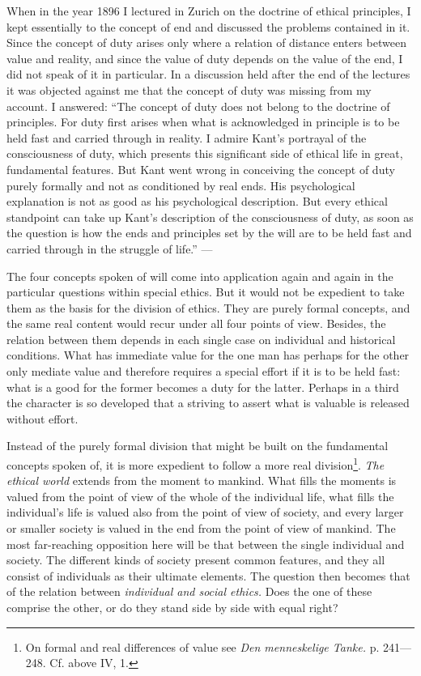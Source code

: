 \documentclass[12pt,a4paper,openany]{book}
\newcommand{\opage}[1]{\marginnote{\footnotesize\textit{[#1]}}}
\begin{document}
When in the year 1896 I lectured in Zurich on the doctrine of ethical principles, I kept essentially to the
concept of end and discussed the problems contained in it. Since the concept of duty arises only where a
relation of distance enters between value and reality, and since the value of duty depends on the value of
the end, I did not speak of it in particular. In a discussion held after the end of the lectures it was
objected against me that the concept of duty was missing from my account. I answered: ``The concept of duty
does not belong to the doctrine of principles. For duty first arises when what is acknowledged in principle
is to be held fast and carried through in reality. I admire Kant's portrayal of the consciousness of duty,
which presents this significant side of ethical life in great, fundamental features. But Kant went wrong in
conceiving the concept of duty purely formally and not as conditioned by real ends. His psychological
explanation is not as good as his psychological description. But every ethical standpoint can take up Kant's
description of the consciousness
\opage{160}of duty, as soon as the question is how the ends and principles set by the will are to be held fast and
carried through in the struggle of life.'' ---

The four concepts spoken of will come into application again and again in the particular questions within
special ethics. But it would not be expedient to take them as the basis for the division of ethics. They are
purely formal concepts, and the same real content would recur under all four points of view. Besides, the
relation between them depends in each single case on individual and historical conditions. What has
immediate value for the one man has perhaps for the other only mediate value and therefore requires a special
effort if it is to be held fast: what is a good for the former becomes a duty for the latter. Perhaps in a
third the character is so developed that a striving to assert what is valuable is released without effort.

Instead of the purely formal division that might be built on the fundamental concepts spoken of, it is more
expedient to follow a more real division\footnote[1]{On formal and real differences of value see \textit{Den
menneskelige Tanke.} p. 241---248. Cf. above IV, 1.}. \textit{The ethical world} extends from the
moment to mankind. What fills the moments is valued from the point of view of the whole of the individual
life, what fills the individual's life is valued also from the point of view of society, and every larger or
smaller society is valued in the end from the point of view of mankind. The most far-reaching opposition here
will be that between the single individual and society. The different kinds of society present common
features, and they all consist of individuals as their ultimate elements. The question then becomes that of
the relation between \textit{individual and social ethics.} Does the one of these comprise the other, or do
they stand side by side with equal right?
\end{document}
